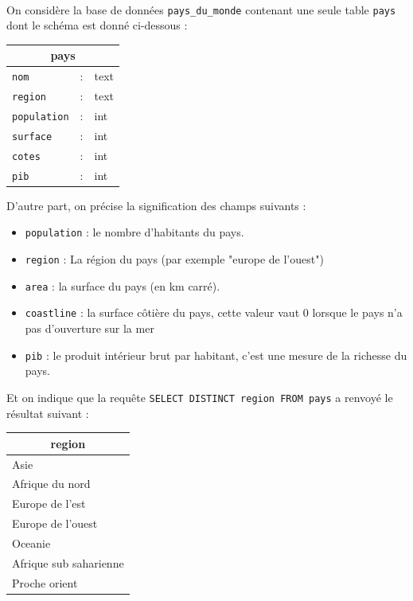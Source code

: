 \documentclass[11pt,a4paper]{article}
\begin{document}
\begin{Exercise}[title={requête {\sc sql} sur une seule table}]\\
	On considère la base de données {\tt pays\_du\_monde} contenant une seule table {\tt pays} dont le schéma est donné ci-dessous :
	\begin{center}
	\begin{tabular}{|lll|}
		\hline
		\multicolumn{3}{|c|}{\textbf{pays}} \\
		\hline
		{\tt nom} & : & {\sc text} \\
		\hline
		{\tt region} & : & {\sc text} \\
		\hline
		{\tt population} & : & {\sc int} \\
		\hline
		{\tt surface} & : & {\sc int} \\
		\hline
		{\tt cotes} & : & {\sc int} \\
		\hline
		{\tt pib} & : & {\sc int} \\
		\hline
		\end{tabular}
	\end{center}
	D'autre part, on précise la signification des champs suivants : 
	\begin{itemize}
		\item {\tt population} : le nombre d'habitants du pays.
		\item {\tt region} : La région du pays (par exemple "europe de l'ouest")
		\item {\tt area} : la surface du pays (en km carré).
		\item {\tt coastline} : la surface côtière du pays, cette valeur vaut 0 lorsque le pays n'a pas d'ouverture sur la mer
		\item {\tt pib} : le produit intérieur brut par habitant, c'est une mesure de la richesse du pays.
		\end{itemize}
	Et on indique que la requête \texttt{SELECT DISTINCT region FROM pays} a renvoyé le résultat suivant : 
	\begin{center}
	\begin{tabular}{|l|}
		\hline
		\multicolumn{1}{|c|}{\textbf{region}} \\
		\hline
		Asie \\
		Afrique du nord \\
		Europe de l'est \\
		Europe de l'ouest \\
		Oceanie \\
		Afrique sub saharienne \\
		Proche orient\\

\end{tabular}
\end{center}
\end{Exercise}
\end{document}
